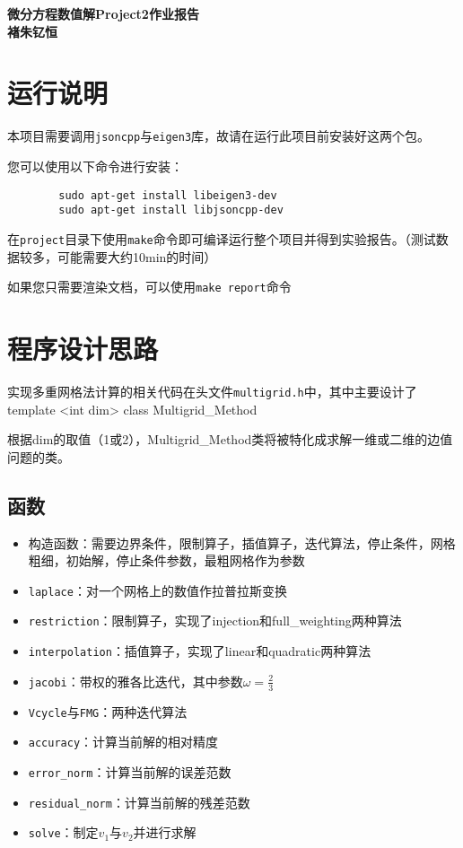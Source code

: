 \documentclass[12]{article}%
\begin{document}
\begin{center}
    \LARGE\songti\textbf{微分方程数值解Project2作业报告} \\%
    \large\kaishu\textbf{褚朱钇恒}%
\end{center}
\section{运行说明}
    本项目需要调用\verb|jsoncpp|与\verb|eigen3|库，故请在运行此项目前安装好这两个包。
    
    您可以使用以下命令进行安装：

    \begin{lstlisting}
        sudo apt-get install libeigen3-dev
        sudo apt-get install libjsoncpp-dev
    \end{lstlisting}

    在\verb|project|目录下使用\verb|make|命令即可编译运行整个项目并得到实验报告。（测试数据较多，可能需要大约10min的时间）

    如果您只需要渲染文档，可以使用\verb|make report|命令

\section{程序设计思路}
实现多重网格法计算的相关代码在头文件\verb|multigrid.h|中，其中主要设计了template <int dim> class Multigrid\_Method

根据dim的取值（1或2），Multigrid\_Method类将被特化成求解一维或二维的边值问题的类。

\subsection{函数}
\begin{itemize}
    \item 构造函数：需要边界条件，限制算子，插值算子，迭代算法，停止条件，网格粗细，初始解，停止条件参数，最粗网格作为参数
    \item \verb|laplace|：对一个网格上的数值作拉普拉斯变换
    \item \verb|restriction|：限制算子，实现了injection和full\_weighting两种算法
    \item \verb|interpolation|：插值算子，实现了linear和quadratic两种算法
    \item \verb|jacobi|：带权的雅各比迭代，其中参数$\omega=\frac{2}{3}$
    \item \verb|Vcycle|与\verb|FMG|：两种迭代算法
    \item \verb|accuracy|：计算当前解的相对精度
    \item \verb|error_norm|：计算当前解的误差范数
    \item \verb|residual_norm|：计算当前解的残差范数
    \item \verb|solve|：制定$v_1$与$v_2$并进行求解
\end{itemize}
\end{document}
